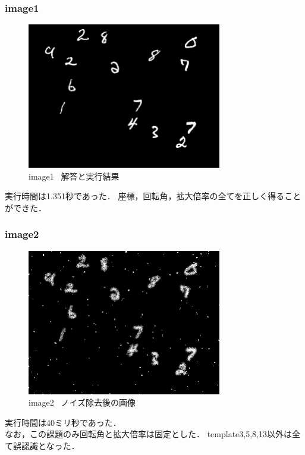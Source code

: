 \documentclass[platex,dvipdfmx]{jsarticle}
\begin{document}
\subsubsection{image1}
\begin{figure}[h]
\centering
\includegraphics[clip,width = 8.5cm]{images/image1.png}
\caption{image1~ 解答と実行結果}
\label{graph1}
\end{figure}


実行時間は1.351秒であった．
座標，回転角，拡大倍率の全てを正しく得ることができた．

\subsubsection{image2}
\begin{figure}[h]
\centering
\includegraphics[clip,width = 8.5cm]{images/image2.png}
\caption{image2~ ノイズ除去後の画像}
\label{graph2}
\end{figure}


実行時間は40ミリ秒であった．\\
なお，この課題のみ回転角と拡大倍率は固定とした．
template3,5,8,13以外は全て誤認識となった．
\end{document}
